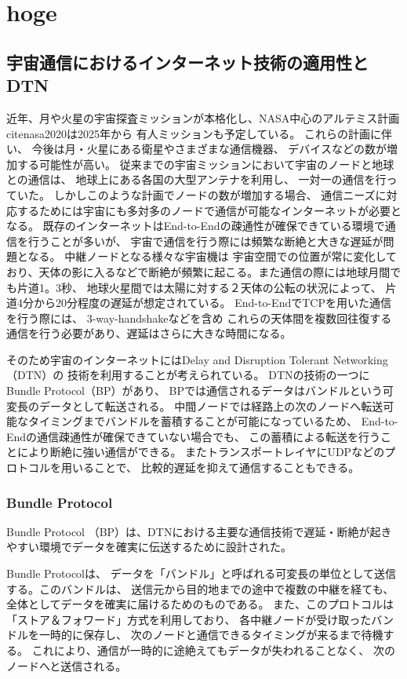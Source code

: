 \chapter{hoge}
\section{宇宙通信におけるインターネット技術の適用性とDTN}
近年、月や火星の宇宙探査ミッションが本格化し、NASA中心のアルテミス計画citenasa2020は2025年から
有人ミッションも予定している。 これらの計画に伴い、 今後は月・火星にある衛星やさまざまな通信機器、 
デバイスなどの数が増加する可能性が高い。 従来までの宇宙ミッションにおいて宇宙のノードと地球との通信は、 
地球上にある各国の大型アンテナを利用し、 一対一の通信を行っていた。 しかしこのような計画でノードの数が増加する場合、
通信ニーズに対応するためには宇宙にも多対多のノードで通信が可能なインターネットが必要となる。 
既存のインターネットはEnd-to-Endの疎通性が確保できている環境で通信を行うことが多いが、 
宇宙で通信を行う際には頻繁な断絶と大きな遅延が問題となる。 中継ノードとなる様々な宇宙機は
宇宙空間での位置が常に変化しており、天体の影に入るなどで断絶が頻繁に起こる。また通信の際には地球月間でも片道1。3秒、 
地球火星間では太陽に対する２天体の公転の状況によって、 片道4分から20分程度の遅延が想定されている。 
End-to-EndでTCPを用いた通信を行う際には、 3-way-handshakeなどを含め
これらの天体間を複数回往復する通信を行う必要があり、遅延はさらに大きな時間になる。 

そのため宇宙のインターネットにはDelay and Disruption Tolerant Networking（DTN）の
技術を利用することが考えられている。 DTNの技術の一つにBundle Protocol（BP）があり、 
BPでは通信されるデータはバンドルという可変長のデータとして転送される。 
中間ノードでは経路上の次のノードへ転送可能なタイミングまでバンドルを蓄積することが可能になっているため、 
End-to-Endの通信疎通性が確保できていない場合でも、 この蓄積による転送を行うことにより断絶に強い通信ができる。
 またトランスポートレイヤにUDPなどのプロトコルを用いることで、 
 比較的遅延を抑えて通信することもできる。 

\subsection{Bundle Protocol}
Bundle Protocol （BP）は、DTNにおける主要な通信技術で遅延・断絶が起きやすい環境でデータを確実に伝送するために設計された。

Bundle Protocolは、 データを「バンドル」と呼ばれる可変長の単位として送信する。このバンドルは、 
送信元から目的地までの途中で複数の中継を経ても、全体としてデータを確実に届けるためのものである。 
また、このプロトコルは「ストア＆フォワード」方式を利用しており、 各中継ノードが受け取ったバンドルを一時的に保存し、 
次のノードと通信できるタイミングが来るまで待機する。 これにより、通信が一時的に途絶えてもデータが失われることなく、 次のノードへと送信される。

